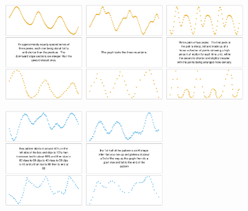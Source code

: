 \documentclass[a4paper,man, floatsintext, natbib]{apa6}
\begin{document}
\begin{figure}[h] 
\centerline{
\includegraphics[width=0.3\textwidth]{compexample1.pdf}
\includegraphics[width=0.3\textwidth]{compexample2.pdf}
\includegraphics[width=0.3\textwidth]{compexample3.pdf}
}%
\centerline{
\includegraphics[width=0.3\textwidth]{specexample1.pdf}
\includegraphics[width=0.3\textwidth]{specexample2.pdf}
}
\end{figure}
\end{document}
